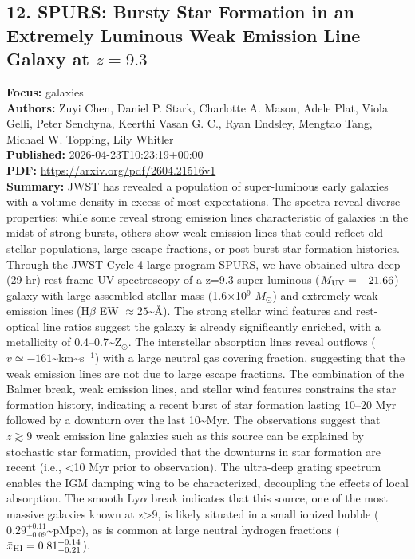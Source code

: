 \documentclass[11pt]{article}
\begin{document}
\subsection*{12. SPURS: Bursty Star Formation in an Extremely Luminous Weak Emission Line Galaxy at $z=9.3$}
\textbf{Focus:} galaxies\\
\textbf{Authors:} Zuyi Chen, Daniel P. Stark, Charlotte A. Mason, Adele Plat, Viola Gelli, Peter Senchyna, Keerthi Vasan G. C., Ryan Endsley, Mengtao Tang, Michael W. Topping, Lily Whitler\\
\textbf{Published:} 2026-04-23T10:23:19+00:00\\
\textbf{PDF:} \href{https://arxiv.org/pdf/2604.21516v1}{https://arxiv.org/pdf/2604.21516v1}\\
\textbf{Summary:}
JWST has revealed a population of super-luminous early galaxies with a volume density in excess of most expectations. The spectra reveal diverse properties: while some reveal strong emission lines characteristic of galaxies in the midst of strong bursts, others show weak emission lines that could reflect old stellar populations, large escape fractions, or post-burst star formation histories. Through the JWST Cycle 4 large program SPURS, we have obtained ultra-deep (29 hr) rest-frame UV spectroscopy of a z=9.3 super-luminous ($M_{\rm UV}=-21.66$) galaxy with large assembled stellar mass (1.6$\times$10$^9$ $M_\odot$) and extremely weak emission lines (H$\beta $ EW $\approx25$\textasciitilde{}Å). The strong stellar wind features and rest-optical line ratios suggest the galaxy is already significantly enriched, with a metallicity of 0.4--0.7\textasciitilde{}Z$_\odot$. The interstellar absorption lines reveal outflows ($v\simeq -161$\textasciitilde{}km\textasciitilde{}s$^{-1}$) with a large neutral gas covering fraction, suggesting that the weak emission lines are not due to large escape fractions. The combination of the Balmer break, weak emission lines, and stellar wind features constrains the star formation history, indicating a recent burst of star formation lasting 10--20 Myr followed by a downturn over the last 10\textasciitilde{}Myr. The observations suggest that $z\gtrsim 9$ weak emission line galaxies such as this source can be explained by stochastic star formation, provided that the downturns in star formation are recent (i.e., <10 Myr prior to observation). The ultra-deep grating spectrum enables the IGM damping wing to be characterized, decoupling the effects of local absorption. The smooth Ly$\alpha $ break indicates that this source, one of the most massive galaxies known at z>9, is likely situated in a small ionized bubble ($0.29_{-0.09}^{+0.11}$\textasciitilde{}pMpc), as is common at large neutral hydrogen fractions ($\bar{x}_{\rm HI}=0.81_{-0.21}^{+0.14}$).
\newpage
\end{document}
